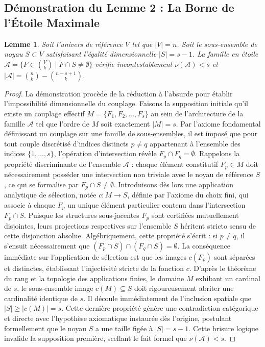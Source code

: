 \documentclass[12pt]{article}
\newtheorem{lemma}{Lemme}
\begin{document}
\newpage
\subsection{D\'emonstration du Lemme 2 : La Borne de l'\'Etoile Maximale}

\begin{lemma}
Soit l'univers de r\'ef\'erence $V$ tel que $|V| = n$. Soit le sous-ensemble de noyau $S \subset V$ satisfaisant l'\'egalit\'e dimensionnelle $|S| = s - 1$.
La famille en \'etoile $\mathcal{A} = \{ F \in \binom{V}{k} \mid F \cap S \neq \emptyset \}$ v\'erifie incontestablement $\nu(\mathcal{A}) < s$ et $|\mathcal{A}| = \binom{n}{k} - \binom{n - s + 1}{k}$.
\end{lemma}

\begin{proof}
La d\'emonstration proc\`ede de la r\'eduction \`a l'absurde pour \'etablir l'impossibilit\'e dimensionnelle du couplage.
Faisons la supposition initiale qu'il existe un couplage effectif $M = \{F_1, F_2, \ldots, F_s\}$ au sein de l'architecture de la famille $\mathcal{A}$ tel que l'ordre de $M$ soit exactement $|M| = s$.
Par l'axiome fondamental d\'efinissant un couplage sur une famille de sous-ensembles, il est impos\'e que pour tout couple discr\'etis\'e d'indices distincts $p \neq q$ appartenant \`a l'ensemble des indices $\{1, \dots, s\}$, l'op\'eration d'intersection r\'ev\`ele $F_p \cap F_q = \emptyset$.
Rappelons la propri\'et\'e discriminante de l'ensemble $\mathcal{A}$ : chaque \'el\'ement constitutif $F_p \in M$ doit n\'ecessairement poss\'eder une intersection non triviale avec le noyau de r\'ef\'erence $S$, ce qui se formalise par $F_p \cap S \neq \emptyset$.
Introduisons d\`es lors une application analytique de s\'election, not\'ee $c : M \to S$, d\'efinie par l'axiome du choix fini, qui associe \`a chaque $F_p$ un unique \'el\'ement particulier contenu dans l'intersection $F_p \cap S$.
Puisque les structures sous-jacentes $F_p$ sont certifi\'ees mutuellement disjointes, leurs projections respectives sur l'ensemble $S$ h\'eritent stricto sensu de cette disjonction absolue.
Alg\'ebriquement, cette propri\'et\'e s'\'ecrit : si $p \neq q$, il s'ensuit n\'ecessairement que $(F_p \cap S) \cap (F_q \cap S) = \emptyset$.
La cons\'equence imm\'ediate sur l'application de s\'election est que les images $c(F_p)$ sont s\'epar\'ees et distinctes, \'etablissant l'injectivit\'e stricte de la fonction $c$.
D'apr\`es le th\'eor\`eme du rang et la topologie des applications finies, le domaine $M$ exhibant un cardinal de $s$, le sous-ensemble image $c(M) \subseteq S$ doit rigoureusement abriter une cardinalit\'e identique de $s$.
Il d\'ecoule imm\'ediatement de l'inclusion spatiale que $|S| \ge |c(M)| = s$.
Cette derni\`ere propri\'et\'e g\'en\`ere une contradiction cat\'egorique et directe avec l'hypoth\`ese axiomatique instaur\'ee d\`es l'origine, postulant formellement que le noyau $S$ a une taille fig\'ee \`a $|S| = s - 1$.
Cette brisure logique invalide la supposition premi\`ere, scellant le fait formel que $\nu(\mathcal{A}) < s$.


\end{proof}
\end{document}
